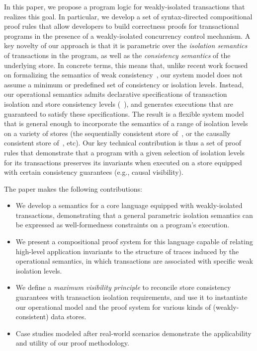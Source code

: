 
In this paper, we propose a program logic for weakly-isolated
transactions that realizes this goal.  In particular, we develop a set
of syntax-directed compositional proof rules that allow developers to
build correctness proofs for transactional programs in the presence of
a weakly-isolated concurrency control mechanism.  A key novelty of our
approach is that it is parametric over the \emph{isolation semantics}
of transactions in the program, as well as the \emph{consistency
  semantics} of the underlying store. In concrete terms, this means
that, unlike recent work focused on formalizing the semantics of weak
consistency~\cite{gotsmanpopl16, redblueatc, ecinec}, our system model
does not assume a minimum or predefined set of consistency or
isolation levels. Instead, our operational semantics admits
declarative specifications of transaction isolation and store
consistency levels (\eg~\cite{pldi15,gotsmanconcur15}), and generates
executions that are guaranteed to satisfy these specifications. The
result is a flexible system model that is general enough to
incorporate the semantics of a range of isolation levels on a variety
of stores (\eg the sequentially consistent store of~\cite{adyaphd}, or
the causally consistent store of~\cite{gotsmanpopl16}, etc).  Our key
technical contribution is thus a set of proof rules that demonstrate
that a program with a given selection of isolation levels for its
transactions preserves its invariants when executed on a store
equipped with certain consistency guarantees (e.g., causal
visibility).

The paper makes the following contributions:
\begin{itemize}
  \item We develop a semantics for a core language equipped with
    weakly-isolated transactions, demonstrating that a general
    parametric isolation semantics can be expressed as
    well-formedness constraints on a program's execution.
  \item We present a compositional proof system for this language
    capable of relating high-level application invariants to the structure
    of traces induced by the operational semantics, in which transactions
    are associated with specific weak isolation levels.
  \item We define a \emph{maximum visibility principle} to reconcile
    store consistency guarantees with transaction isolation
    requirements, and use it to instantiate our operational model and
    the proof system for various kinds of (weakly-consistent) data
    stores.
  \item Case studies modeled after real-world scenarios demonstrate
    the applicability and utility of our proof methodology.
\end{itemize}

